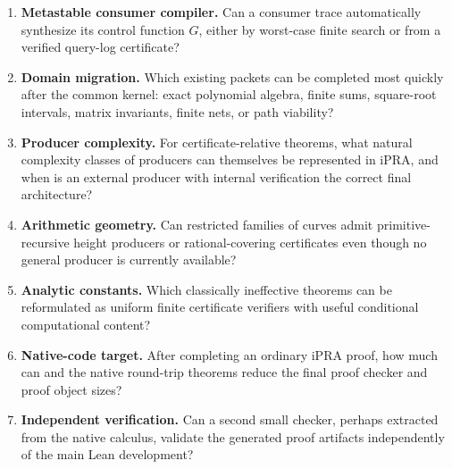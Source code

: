 \begin{enumerate}[label=\textbf{Q\arabic*.}]
\item \textbf{Metastable consumer compiler.}  Can a consumer trace automatically
      synthesize its control function \(G\), either by worst-case finite search
      or from a verified query-log certificate?

\item \textbf{Domain migration.}  Which existing packets can be completed most
      quickly after the common kernel: exact polynomial algebra, finite sums,
      square-root intervals, matrix invariants, finite nets, or path viability?

\item \textbf{Producer complexity.}  For certificate-relative theorems, what
      natural complexity classes of producers can themselves be represented in
      iPRA, and when is an external producer with internal verification the
      correct final architecture?

\item \textbf{Arithmetic geometry.}  Can restricted families of curves admit
      primitive-recursive height producers or rational-covering certificates
      even though no general producer is currently available?

\item \textbf{Analytic constants.}  Which classically ineffective theorems can
      be reformulated as uniform finite certificate verifiers with useful
      conditional computational content?

\item \textbf{Native-code target.}  After completing an ordinary iPRA proof,
      how much can  and the native round-trip theorems
      reduce the final proof checker and proof object sizes?

\item \textbf{Independent verification.}  Can a second small checker, perhaps
      extracted from the native calculus, validate the generated proof
      artifacts independently of the main Lean development?
\end{enumerate}

